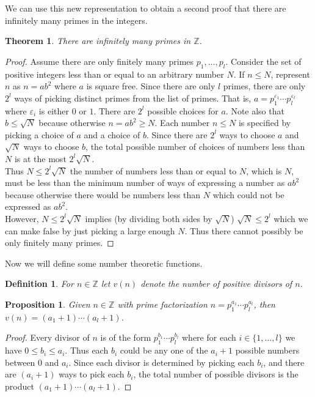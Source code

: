 \documentclass{article}
\theoremstyle{problemstyle}
\newtheorem{theorem}{Theorem}
\newtheorem{proposition}{Proposition}
\newtheorem{definition}{Definition}
\begin{document}
We can use this new representation to obtain a second proof that there are infinitely many primes in the integers. 

\begin{theorem}
There are infinitely many primes in $\mathbb{Z}$. 
\end{theorem}

\begin{proof}
Assume there are only finitely many primes $p_1,\ldots,p_l$. Consider the set of positive integers less than or equal to an arbitrary number $N$. If $n \leq N$, represent $n$ as $n = ab^2$ where $a$ is square free. Since there are only $l$ primes, there are only $2^l$ ways of picking distinct primes from the list of primes. That is, $a = p_1^{\varepsilon_1}\cdots p_l^{\varepsilon_l}$ where $\varepsilon_i$ is either $0$ or $1$. There are $2^l$ possible choices for $a$. Note also that $b \leq \sqrt{N}$ because otherwise $n = ab^2 \geq N$. Each number $n \leq N$ is specified by picking a choice of $a$ and a choice of $b$. Since there are $2^l$ ways to choose $a$ and $\sqrt{N}$ ways to choose $b$, the total possible number of choices of numbers less than $N$ is at the most $2^l\sqrt{N}$.\\

Thus $N \leq 2^l\sqrt{N}$ the number of numbers less than or equal to $N$, which is $N$, must be less than the minimum number of ways of expressing a number as $ab^2$ because otherwise there would be numbers less than $N$ which could not be expressed as $ab^2$. \\

However, $N \leq 2^l\sqrt{N}$ implies (by dividing both sides by $\sqrt{N}$) $\sqrt{N} \leq 2^l$ which we can make false by just picking a large enough $N$. Thus there cannot possibly be only finitely many primes. 
\end{proof}

Now we will define some number theoretic functions. 

\begin{definition}
For $n \in \mathbb{Z}$ let $v(n)$ denote the number of positive divisors of $n$. 
\end{definition}

\begin{proposition}
Given $n \in \mathbb{Z}$ with prime factorization $n = p_1^{a_1}\cdots p_l^{a_l}$, then $v(n) = (a_1+1)\cdots(a_l+1)$. 
\end{proposition}

\begin{proof}
Every divisor of $n$ is of the form $p_1^{b_1}\cdots p_l^{b_l}$ where for each $i \in \{1,\ldots,l\}$ we have $0 \leq b_i \leq a_i$. Thus each $b_i$ could be any one of the $a_i+1$ possible numbers between $0$ and $a_i$. Since each divisor is determined by picking each $b_i$, and there are $(a_i+1)$ ways to pick each $b_i$, the total number of possible divisors is the product $(a_1+1)\cdots(a_l+1)$. 
\end{proof}
\end{document}
